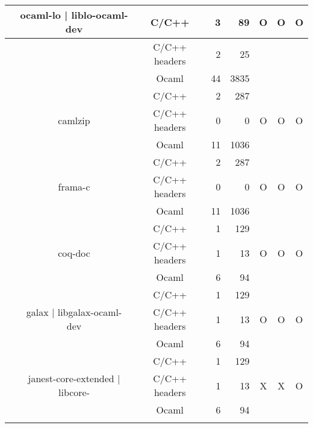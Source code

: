 \documentclass[11pt,a4paper]{article}
\begin{document}
\begin{table}[h,t]
\begin{tabular}{|>{\centering}m{3cm}| c|c|r|r| c| c|c|}
 & \multirow{3}{3cm}{ocaml-lo | liblo-ocaml-dev } & C/C++ & 3 & 89 & \multirow{3}{*}{O} & \multirow{3}{*}{O} & \multirow{3}{*}{O}\\
 \cline{3-5}
 & &                           C/C++ headers & 2 & 25 & & & \\
 \cline{3-5}
 & &                          Ocaml & 44& 3835 & & & \\
 \cline{2-8}





 &\multirow{3}{*}{camlzip} & C/C++ & 2 & 287 & \multirow{3}{*}{O} & \multirow{3}{*}{O} & \multirow{3}{*}{O}\\
 \cline{3-5}
 & &                           C/C++ headers & 0 & 0 & & & \\
 \cline{3-5}
 & &                          Ocaml & 11 & 1036 & & & \\
 \cline{2-8}



 &\multirow{3}{*}{frama-c} & C/C++ & 2 & 287 & \multirow{3}{*}{O} & \multirow{3}{*}{O} & \multirow{3}{*}{O}\\
 \cline{3-5}
 & &                           C/C++ headers & 0 & 0 & & & \\
 \cline{3-5}
 & &                          Ocaml & 11 & 1036 & & & \\
 \cline{2-8}


 &\multirow{3}{3cm}{coq-doc} & C/C++ & 1 & 129 & \multirow{3}{*}{O} & \multirow{3}{*}{O} & \multirow{3}{*}{O}\\
\cline{3-5}
& &                           C/C++ headers & 1 & 13 & & & \\
\cline{3-5}
& &                          Ocaml & 6 & 94 & & & \\
\cline{2-8}


 &\multirow{3}{3cm}{galax | libgalax-ocaml-dev} & C/C++ & 1 & 129 & \multirow{3}{*}{O} & \multirow{3}{*}{O} & \multirow{3}{*}{O}\\
\cline{3-5}
& &                           C/C++ headers & 1 & 13 & & & \\
\cline{3-5}
& &                          Ocaml & 6 & 94 & & & \\
\cline{2-8}

&\multirow{3}{3cm}{janest-core-extended | libcore-} & C/C++ & 1 & 129 & \multirow{3}{*}{X} & \multirow{3}{*}{X} & \multirow{3}{*}{O}\\
\cline{3-5}
& &                           C/C++ headers & 1 & 13 & & & \\
\cline{3-5}
& &                          Ocaml & 6 & 94 & & & \\
\cline{2-8}




\end{tabular}
\end{table}
\end{document}
